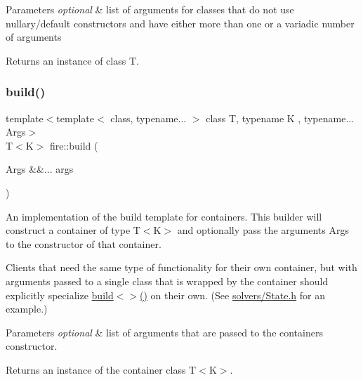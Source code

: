 \begin{DoxyParams}{Parameters}
{\em optional} & list of arguments for classes that do not use nullary/default constructors and have either more than one or a variadic number of arguments \\
\hline
\end{DoxyParams}
\begin{DoxyReturn}{Returns}
an instance of class T. 
\end{DoxyReturn}
\mbox{\label{a00171_a6b760990569b5c37dc8db51881ae9646}} 
\subsubsection{\texorpdfstring{build()}{build()}\hspace{0.1cm}{\footnotesize\ttfamily [2/6]}}
{\footnotesize\ttfamily template$<$template$<$ class, typename... $>$ class T, typename K , typename... Args$>$ \\
T$<$K$>$ fire\+::build (\begin{DoxyParamCaption}\item[{Args \&\&...}]{args }\end{DoxyParamCaption})}

An implementation of the build template for containers. This builder will construct a container of type T$<$\+K$>$ and optionally pass the arguments Args to the constructor of that container.

Clients that need the same type of functionality for their own container, but with arguments passed to a single class that is wrapped by the container should explicitly specialize \hyperlink{a00171_abca66b4f2a1543308b663714bd8b4855}{build$<$$>$()} on their own. (See \hyperlink{a00095_source}{solvers/\+State.\+h} for an example.)


\begin{DoxyParams}{Parameters}
{\em optional} & list of arguments that are passed to the container\textquotesingle{}s constructor. \\
\hline
\end{DoxyParams}
\begin{DoxyReturn}{Returns}
an instance of the container class T$<$\+K$>$. 
\end{DoxyReturn}
\mbox{\label{a00171_a138f22945f7a7ec642432fd24a94b414}} 
